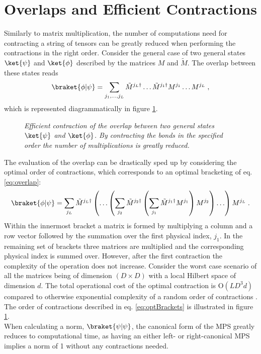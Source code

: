 \section{Overlaps and Efficient Contractions}
Similarly to matrix multiplication, the number of computations need for contracting a string of tensors can be greatly reduced when performing the contractions in the right order. Consider the general case of two general states $\ket{\psi}$ and $\ket{\phi}$ described by the matrices $M$ and $\tilde{M}$. The overlap between these states reads
\begin{equation}
	\braket{\phi | \psi} = \sum_{j_1 , \ldots , j_L} \tilde{M}^{j_L \dag} \ldots \tilde{M}^{j_1 \dag} M^{j_1} \ldots M^{j_L} \; , 
	\label{eq:overlap}
\end{equation}
which is represented diagrammatically in figure \ref{fig:effCont}.
\begin{figure}[h!]
	\centering
	
	\caption{\textit{Efficient contraction of the overlap between two general states $\ket{\psi}$ and $\ket{\phi}$. By contracting the bonds in the specified order the number of multiplications is greatly reduced.}}
	\label{fig:effCont}
\end{figure}
The evaluation of the overlap can be drastically sped up by considering the optimal order of contractions, which corresponds to an optimal bracketing of eq. \eqref{eq:overlap}:
\begin{equation}
	\braket{\phi | \psi} = \sum_{j_L} \tilde{M}^{j_L \dag} \left( \ldots \left( \sum_{j_2} \tilde{M}^{j_2 \dag} \left( \sum_{j_1} \tilde{M}^{j_1 \dag} M^{j_1} \right) M^{j_2} \right) \ldots \right) M^{j_L} \; .
	\label{eq:optBrackets}
\end{equation}  
Within the innermost bracket a matrix is formed by multiplying a column and a row vector followed by the summation over the first physical index, $j_1$. In the remaining set of brackets three matrices are multiplied and the corresponding physical index is summed over. However, after the first contraction the complexity of the operation does not increase. Consider the worst case scenario of all the matrices being of dimension $(D \times D)$ with a local Hilbert space of dimension $d$. The total operational cost of the optimal contraction is $\mathrm{O}(L D^3 d)$ compared to otherwise exponential complexity of a random order of contractions \cite{schollwock}. The order of contractions described in eq. \eqref{eq:optBrackets} is illustrated in figure \ref{fig:effCont}.\\
When calculating a norm, $\braket{\psi | \psi}$, the canonical form of the MPS greatly reduces to computational time, as having an either left- or right-canonical MPS implies a norm of 1 without any contractions needed.

